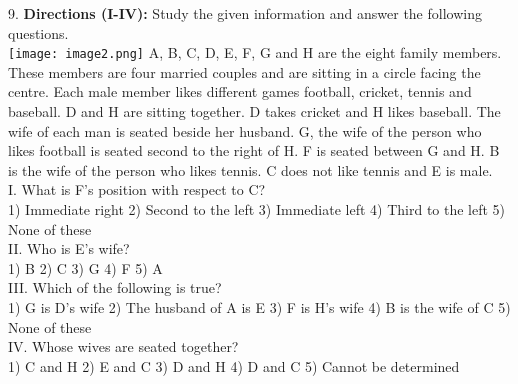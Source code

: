 \documentclass[
]{article}
\begin{document}
9. \textbf{Directions (I-IV):} Study the given information and answer the following questions.\\
\texttt{[image: image2.png]}
A, B, C, D, E, F, G and H are the eight family members. These members are four married
couples and are sitting in a circle facing the centre. Each male member likes different games
football, cricket, tennis and baseball. D and H are sitting together. D takes cricket and H
likes baseball. The wife of each man is seated beside her husband. G, the wife of the person
who likes football is seated second to the right of H. F is seated between G and H. B is the
wife of the person who likes tennis. C does not like tennis and E is male.\\

I. What is F’s position with respect to C?\\
1) Immediate right \hspace{2mm}2) Second to the left \hspace{2mm}3) Immediate left
\hspace{2mm}4) Third to the left \hspace{2mm}5) None of these\\

II. Who is E's wife?\\
1) B \hspace{2mm}2) C \hspace{2mm}3) G \hspace{2mm}4) F \hspace{2mm}5) A\\

III. Which of the following is true?\\
1) G is D's wife \hspace{2mm}2) The husband of A is E \hspace{2mm}3) F is H's wife
\hspace{2mm}4) B is the wife of C \hspace{2mm}5) None of these\\

IV. Whose wives are seated together?\\
1) C and H \hspace{2mm}2) E and C \hspace{2mm}3) D and H \hspace{2mm}4) D and C \hspace{2mm}5) Cannot be determined\\
\end{document}
